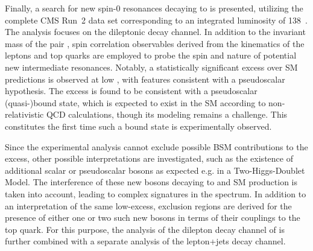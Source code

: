 
Finally, a search for new spin-0 resonances decaying to \ttbar is presented, utilizing the complete CMS Run~2 data set corresponding to an integrated luminosity of \SI{138}{\fbinv}~\cite{CMS:TOP-24-007,CMS:HIG-22-013}. The analysis focuses on the dileptonic decay channel. In addition to the invariant mass of the \ttbar pair \mtt, spin correlation observables derived from the kinematics of the leptons and top quarks are employed to probe the spin and \CP nature of potential new intermediate resonances. Notably, a statistically significant excess over SM predictions is observed at low \mtt, with features consistent with a pseudoscalar hypothesis.
The excess is found to be consistent with a pseudoscalar \ttbar (quasi-)bound state, which is expected to exist in the SM according to non-relativistic QCD calculations, though its modeling remains a challenge. This constitutes the first time such a \ttbar bound state is experimentally observed.


Since the experimental analysis cannot exclude possible BSM contributions to the excess, other possible interpretations are investigated, such as the existence of additional scalar or pseudoscalar bosons as expected e.g. in a Two-Higgs-Doublet Model. 
The interference of these new bosons decaying to \ttbar and SM \ttbar production is taken into account, leading to complex signatures in the \mtt spectrum. In addition to an interpretation of the same low-\mtt excess, exclusion regions are derived for the presence of either one or two such new bosons in terms of their couplings to the top quark. For this purpose, the analysis of the dilepton decay channel of \ttbar is further combined with a separate analysis of the lepton+jets decay channel.

